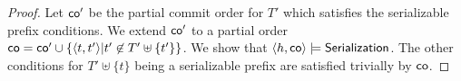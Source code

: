
\begin{proof}
\renewcommand{\qedsymbol}{}
Let $\mathsf{co}'$ be the partial commit order for $T'$ which satisfies the serializable prefix conditions. We extend $\mathsf{co}'$ to a partial order $\mathsf{co} = \mathsf{co}' \cup \{ {\left\langle{{t},{t}'}\right\rangle} | {t}' \not\in T'\uplus\{{t}'\} \}$. We show that ${\left\langle{{h}, \mathsf{co}}\right\rangle} \models \mathsf{Serialization}$. The other conditions for $T'\uplus\{t\}$ being a serializable prefix are satisfied trivially by $\mathsf{co}$. 

\end{proof}
